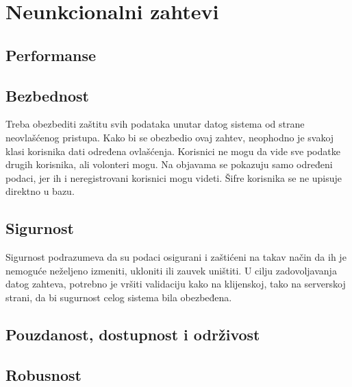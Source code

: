 \section{Neunkcionalni zahtevi}
\subsection{Performanse}
\subsection{Bezbednost}
\par Treba obezbediti zaštitu svih podataka unutar datog sistema od strane neovlašćenog pristupa. Kako bi se obezbedio ovaj zahtev, neophodno je svakoj klasi korisnika dati određena ovlašćenja.
Korisnici ne mogu da vide sve podatke drugih korisnika, ali volonteri mogu. Na objavama se pokazuju samo određeni podaci, jer ih i neregistrovani korisnici mogu videti. Šifre korisnika se ne
upisuje direktno u bazu.
\subsection{Sigurnost}
\par Sigurnost podrazumeva da su podaci osigurani i zaštićeni na takav način da ih je nemoguće neželjeno izmeniti, ukloniti ili zauvek uništiti. U cilju zadovoljavanja datog zahteva, potrebno
je vršiti validaciju kako na klijenskoj, tako na serverskoj strani, da bi sugurnost celog sistema bila obezbeđena.
\subsection{Pouzdanost, dostupnost i održivost}
\subsection{Robusnost}